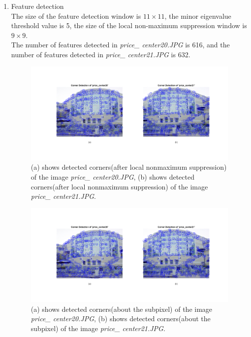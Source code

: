 \documentclass{assignment}
\begin{document}
\begin{problemlist}
\begin{enumerate}
\item Feature detection\\
The size of the feature detection window is $11\times11$, 
the minor eigenvalue threshold value is 5, 
the size of the local non-maximum suppression window is $9\times9$.\\
The number of features detected in \emph{price\_ center20.JPG} is 616, and the number of features detected in \emph{price\_ center21.JPG} is 632.

\begin{figure}[H]
  \includegraphics[width=6in]{CornerDetection_NMS}
\caption{(a) shows detected corners(after local nonmaximum suppression) of the image \emph{price\_ center20.JPG}, (b) shows detected corners(after local nonmaximum suppression) of the image \emph{price\_ center21.JPG}.}
\label{fig:images}
\end{figure}
 
\begin{figure}[H]
  \includegraphics[width=6in]{CornerDetection_Subp}
\caption{(a) shows detected corners(about the subpixel) of the image \emph{price\_ center20.JPG}, (b) shows detected corners(about the subpixel) of the image \emph{price\_ center21.JPG}.}
\label{fig:images}
\end{figure} 





\end{enumerate}
\end{problemlist}
\end{document}
